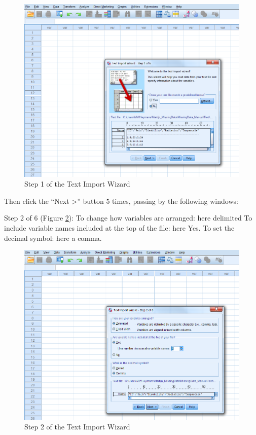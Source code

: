 \documentclass[]{book}
\begin{document}
\begin{figure}

{\centering \includegraphics[width=0.95\linewidth]{images/fig1.19} 

}

\caption{Step 1 of the Text Import Wizard}\label{fig:fig19}
\end{figure}

Then click the ``Next \textgreater{}'' button 5 times, passing by the
following windows:

Step 2 of 6 (Figure \ref{fig:fig20}): To change how variables are
arranged: here delimited To include variable names included at the top
of the file: here Yes. To set the decimal symbol: here a comma.

\begin{figure}

{\centering \includegraphics[width=0.95\linewidth]{images/fig1.20} 

}

\caption{Step 2 of the Text Import Wizard}\label{fig:fig20}
\end{figure}
\end{document}
